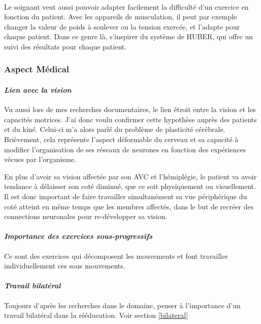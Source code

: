 \paragraph{}Le soignant veut aussi pouvoir adapter facilement la difficulté d'un exercice en fonction du patient. Avec les appareils de musculation, il peut par exemple changer la valeur de poids à soulever ou la tension exercée, et l'adapte pour chaque patient.
Dans ce genre là, s'inspirer du système de HUBER, qui offre un suivi des résultats pour chaque patient.

	\subsubsection*{Aspect Médical}

		\paragraph{\emph{Lien avec la vision}\\}
Vu aussi lors de mes recherches documentaires, le lien étroit entre la vision et les capacités motrices. J'ai donc voulu confirmer cette hypothèse auprès des patients et du kiné. Celui-ci m'a alors parlé du problème de plasticité cérébrale. Brièvement, cela représente l'aspect déformable du cerveau et sa capacité à modifier l'organisation de ses réseaux de neurones en fonction des expériences vécues par l'organisme. 

En plus d'avoir sa vision affectée par son AVC et l'hémiplégie, le patient va avoir tendance à délaisser son coté diminué, que ce soit physiquement ou visuellement. Il est donc important de faire travailler simultanément sa vue périphérique du coté atteint en même temps que les membres affectés, dans le but de recréer des connections neuronales pour re-développer sa vision.

		\paragraph{\emph{Importance des exercices sous-progressifs}\\}
Ce sont des exercices qui décomposent les mouvements et font travailler individuellement ces sous mouvements.

		\paragraph{\emph{Travail bilatéral}\\}
Toujours d'après les recherches dans le domaine, penser à l'importance d'un travail bilatéral dans la rééducation. Voir section \ref{bilateral}


